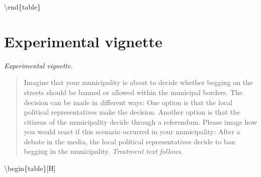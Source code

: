 \documentclass[
]{book}
\begin{document}
\textbackslash end\{table\}

\hypertarget{experimental-vignette}{%
\section{Experimental vignette}\label{experimental-vignette}}

\emph{Experimental vignette.}

\begin{quote}
Imagine that your municipality is about to decide whether begging on the streets should be banned or allowed within the municipal borders. The decision can be made in different ways: One option is that the local political representatives make the decision. Another option is that the citizens of the municipality decide through a referendum. Please image how you would react if this scenario occurred in your municipality: After a debate in the media, the local political representatives decide to ban begging in the municipality. \emph{Treatment text follows.}
\end{quote}

\textbackslash begin\{table\}{[}H{]}
\end{document}
